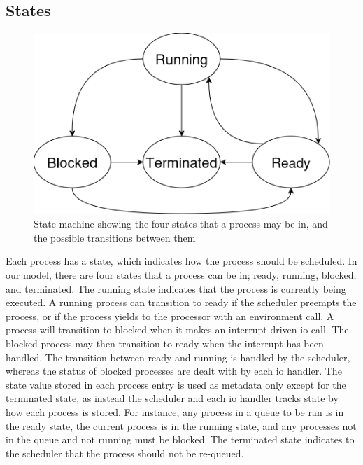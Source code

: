 \subsection{States}
\begin{figure}[H]
    \includegraphics[width=0.8\columnwidth]{figures/states.png}
    \centering
    \caption[State Diagram]{State machine showing the four states that a process may be in, and the possible transitions between them}
\end{figure}
Each process has a state, which indicates how the process should be scheduled. In our model, there are four states that a process can be in; ready, running, blocked, and terminated. The running state indicates that the process is currently being executed. A running process can transition to ready if the scheduler preempts the process, or if the process yields to the processor with an environment call. A process will transition to blocked when it makes an interrupt driven \ac{io} call. The blocked process may then transition to ready when the interrupt has been handled. The transition between ready and running is handled by the scheduler, whereas the status of blocked processes are dealt with by each \ac{io} handler. The state value stored in each process entry is used as metadata only except for the terminated state, as instead the scheduler and each \ac{io} handler tracks state by how each process is stored. For instance, any process in a queue to be ran is in the ready state, the current process is in the running state, and any processes not in the queue and not running must be blocked. The terminated state indicates to the scheduler that the process should not be re-queued.


